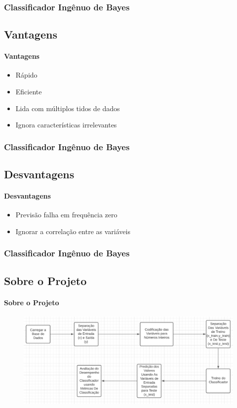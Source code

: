 \documentclass{beamer}
\begin{document}
\begin{frame}
    \frametitle{Classificador Ingênuo de Bayes}
    \subsection{Vantagens}
    \framesubtitle{Vantagens}
    \begin{itemize}
    \item Rápido
    \item Eficiente
    \item Lida com múltiplos tidos de dados
    \item Ignora características irrelevantes
    
    \end{itemize}
    \end{frame}
    \begin{frame}
    \frametitle{Classificador Ingênuo de Bayes}
    \subsection{Desvantagens}
    \framesubtitle{Desvantagens}
    \begin{itemize}
    \item Previsão falha em frequência zero
    \item Ignorar a correlação entre as variáveis
    \end{itemize}
    \end{frame}

\begin{frame}
\frametitle{Classificador Ingênuo de Bayes}
\subsection{Sobre o Projeto}
\framesubtitle{Sobre o Projeto}
\begin{figure}[H]
    \centerline{\includegraphics[width=1.0\textwidth]{IMGS/block1.png}}
\end{figure}    
\end{frame}
\end{document}
